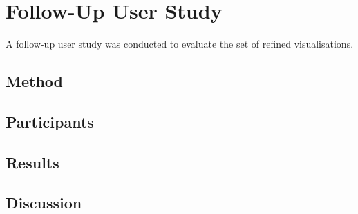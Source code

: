 
\chapter{Follow-Up User Study}
\label{chap:follow-up-user-study}

A follow-up user study was conducted to evaluate the set of refined visualisations.

\section{Method}

\section{Participants}

\section{Results}

\section{Discussion}

